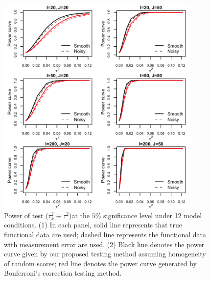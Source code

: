 \begin{figure}[h!]
\centering
\includegraphics[width=0.9\textwidth]{bonf_homo_powercurve.png}
\caption{Power of test ($\tau_k^2\equiv\tau^2$)at the $5\%$ significance level under 12 model conditions. (1) In each panel, solid line represents that true functional data are used; dashed line represents the functional data with measurement error are used. (2) Black line denotes the power curve given by our proposed testing method assuming homogeneity of random scores; red line denotes the power curve generated by Bonferroni's correction testing method.}
\label{functional power curve}
\end{figure}
